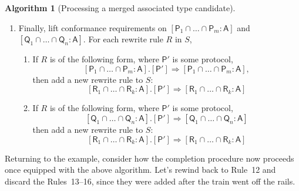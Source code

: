 \documentclass[headsepline,bibliography=totoc]{scrreport}
\newcommand{\namesym}[1]{\mathsf{#1}}
\newcommand{\proto}[1]{\bm{\mathsf{#1}}}
\newcommand{\protosym}[1]{[\proto{#1}]}
\theoremstyle{definition}
\theoremstyle{definition}
\theoremstyle{definition}
\newtheorem{algorithm}{Algorithm}[chapter]
\begin{document}
\begin{algorithm}[Processing a merged associated type candidate]
\begin{enumerate}
\item Finally, lift conformance requirements on $[\proto{P}_1\cap\ldots\cap\proto{P}_m\colon\namesym{A}]$ and $[\proto{Q}_1\cap\ldots\cap\proto{Q}_n\colon\namesym{A}]$. For each rewrite rule $R$ in $S$,
\begin{enumerate}
\item If $R$ is of the following form, where $\proto{P'}$ is some protocol,
\[[\proto{P}_1\cap\ldots\cap\proto{P}_m\colon\namesym{A}].\protosym{P'}\Rightarrow [\proto{P}_1\cap\ldots\cap\proto{P}_m\colon\namesym{A}],\]
then add a new rewrite rule to $S$:
\[[\proto{R}_1\cap\ldots\cap\proto{R}_k\colon\namesym{A}].\protosym{P'}\Rightarrow [\proto{R}_1\cap\ldots\cap\proto{R}_k\colon\namesym{A}]\]
\item If $R$ is of the following form, where $\proto{P'}$ is some protocol,
\[[\proto{Q}_1\cap\ldots\cap\proto{Q}_n\colon\namesym{A}].\protosym{P'}\Rightarrow [\proto{Q}_1\cap\ldots\cap\proto{Q}_n\colon\namesym{A}]\]
then add a new rewrite rule to $S$:
\[[\proto{R}_1\cap\ldots\cap\proto{R}_k\colon\namesym{A}].\protosym{P'}\Rightarrow [\proto{R}_1\cap\ldots\cap\proto{R}_k\colon\namesym{A}]\]
\end{enumerate}

\end{enumerate}
\end{algorithm}

Returning to the example, consider how the completion procedure now proceeds once equipped with the above algorithm. Let's rewind back to Rule~12 and discard the Rules~13--16, since they were added after the train went off the rails.
\end{document}
